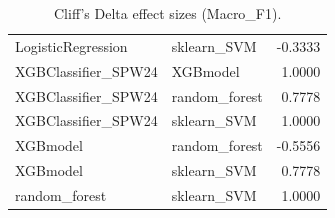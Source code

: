 \begin{table}[t]
\begin{tabular}{llr}
LogisticRegression & sklearn_SVM & -0.3333 \\
XGBClassifier_SPW24 & XGBmodel & 1.0000 \\
XGBClassifier_SPW24 & random_forest & 0.7778 \\
XGBClassifier_SPW24 & sklearn_SVM & 1.0000 \\
XGBmodel & random_forest & -0.5556 \\
XGBmodel & sklearn_SVM & 0.7778 \\
random_forest & sklearn_SVM & 1.0000 \\
\bottomrule
\end{tabular}
\caption{Cliff's Delta effect sizes (Macro_F1).}
\label{tab:cliffs_Macro_F1}
\end{table}